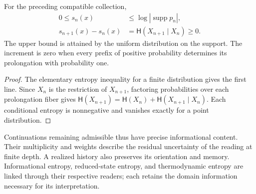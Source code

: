 \begin{proposition}
For the preceding compatible collection,
\begin{align}
 0\leq s_n(x)&\leq\log|\operatorname{supp}p_n|,\\
 s_{n+1}(x)-s_n(x)
 &=\mathsf H(X_{n+1}\mid X_n)\geq0.
 \label{eq:ii-entropia-refinamiento}
\end{align}
The upper bound is attained by the uniform distribution on the
support. The increment is zero when every prefix of positive
probability determines its prolongation with probability one.
\end{proposition}
\begin{proof}
The elementary entropy inequality for a finite distribution
gives the first line. Since \(X_n\) is the restriction of \(X_{n+1}\),
factoring probabilities over each prolongation fiber
gives \(\mathsf H(X_{n+1})=\mathsf H(X_n)+
\mathsf H(X_{n+1}\mid X_n)\). Each conditional entropy is
nonnegative and vanishes exactly for a point distribution.
\end{proof}

Continuations remaining admissible thus have precise
informational content. Their multiplicity and weights describe the
residual uncertainty of the reading at finite depth. A
realized history also preserves its orientation and memory.
Informational entropy, reduced-state entropy, and thermodynamic
entropy are linked through their respective readers; each
retains the domain information necessary for its interpretation.
